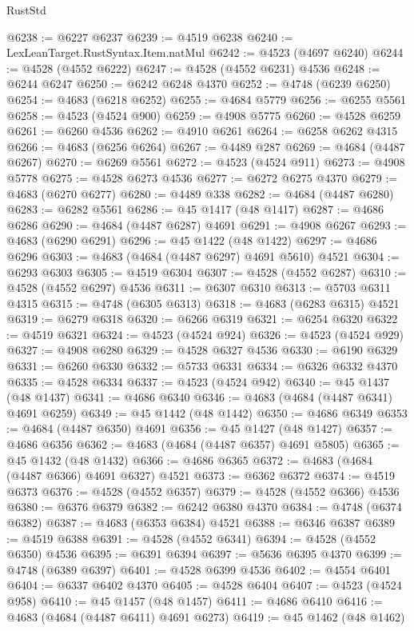 \begin{lexlean}{RustStd}
\begin{coremodule}
@6238 := @6227 @6237
@6239 := @4519 @6238
@6240 := LexLeanTarget.RustSyntax.Item.natMul
@6242 := @4523 (@4697 @6240)
@6244 := @4528 (@4552 @6222)
@6247 := @4528 (@4552 @6231) @4536
@6248 := @6244 @6247
@6250 := @6242 @6248 @4370
@6252 := @4748 (@6239 @6250)
@6254 := @4683 (@6218 @6252)
@6255 := @4684 @5779
@6256 := @6255 @5561
@6258 := @4523 (@4524 @900)
@6259 := @4908 @5775
@6260 := @4528 @6259
@6261 := @6260 @4536
@6262 := @4910 @6261
@6264 := @6258 @6262 @4315
@6266 := @4683 (@6256 @6264)
@6267 := @4489 @287
@6269 := @4684 (@4487 @6267)
@6270 := @6269 @5561
@6272 := @4523 (@4524 @911)
@6273 := @4908 @5778
@6275 := @4528 @6273 @4536
@6277 := @6272 @6275 @4370
@6279 := @4683 (@6270 @6277)
@6280 := @4489 @338
@6282 := @4684 (@4487 @6280)
@6283 := @6282 @5561
@6286 := @45 @1417 (@48 @1417)
@6287 := @4686 @6286
@6290 := @4684 (@4487 @6287) @4691
@6291 := @4908 @6267
@6293 := @4683 (@6290 @6291)
@6296 := @45 @1422 (@48 @1422)
@6297 := @4686 @6296
@6303 := @4683 (@4684 (@4487 @6297) @4691 @5610) @4521
@6304 := @6293 @6303
@6305 := @4519 @6304
@6307 := @4528 (@4552 @6287)
@6310 := @4528 (@4552 @6297) @4536
@6311 := @6307 @6310
@6313 := @5703 @6311 @4315
@6315 := @4748 (@6305 @6313)
@6318 := @4683 (@6283 @6315) @4521
@6319 := @6279 @6318
@6320 := @6266 @6319
@6321 := @6254 @6320
@6322 := @4519 @6321
@6324 := @4523 (@4524 @924)
@6326 := @4523 (@4524 @929)
@6327 := @4908 @6280
@6329 := @4528 @6327 @4536
@6330 := @6190 @6329
@6331 := @6260 @6330
@6332 := @5733 @6331
@6334 := @6326 @6332 @4370
@6335 := @4528 @6334
@6337 := @4523 (@4524 @942)
@6340 := @45 @1437 (@48 @1437)
@6341 := @4686 @6340
@6346 := @4683 (@4684 (@4487 @6341) @4691 @6259)
@6349 := @45 @1442 (@48 @1442)
@6350 := @4686 @6349
@6353 := @4684 (@4487 @6350) @4691
@6356 := @45 @1427 (@48 @1427)
@6357 := @4686 @6356
@6362 := @4683 (@4684 (@4487 @6357) @4691 @5805)
@6365 := @45 @1432 (@48 @1432)
@6366 := @4686 @6365
@6372 := @4683 (@4684 (@4487 @6366) @4691 @6327) @4521
@6373 := @6362 @6372
@6374 := @4519 @6373
@6376 := @4528 (@4552 @6357)
@6379 := @4528 (@4552 @6366) @4536
@6380 := @6376 @6379
@6382 := @6242 @6380 @4370
@6384 := @4748 (@6374 @6382)
@6387 := @4683 (@6353 @6384) @4521
@6388 := @6346 @6387
@6389 := @4519 @6388
@6391 := @4528 (@4552 @6341)
@6394 := @4528 (@4552 @6350) @4536
@6395 := @6391 @6394
@6397 := @5636 @6395 @4370
@6399 := @4748 (@6389 @6397)
@6401 := @4528 @6399 @4536
@6402 := @4554 @6401
@6404 := @6337 @6402 @4370
@6405 := @4528 @6404
@6407 := @4523 (@4524 @958)
@6410 := @45 @1457 (@48 @1457)
@6411 := @4686 @6410
@6416 := @4683 (@4684 (@4487 @6411) @4691 @6273)
@6419 := @45 @1462 (@48 @1462)

\end{coremodule}
\end{lexlean}
